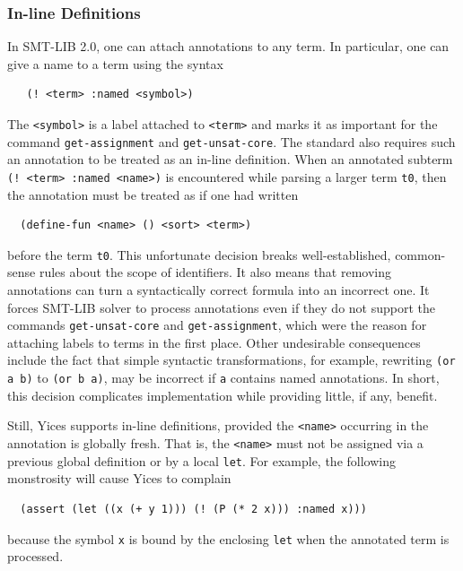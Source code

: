 \documentclass[11pt,twoside,fleqn,openright,titlepage]{cslreport}
\begin{document}
\subsubsection*{In-line Definitions}

In SMT-LIB 2.0, one can attach annotations to any term. In particular,
one can give a name to a term using the syntax
\begin{small}
\begin{verbatim}
   (! <term> :named <symbol>)
\end{verbatim}
\end{small}
The \texttt{<symbol>} is a label attached to \texttt{<term>} and marks
it as important for the command \texttt{get-assignment} and
\texttt{get-unsat-core}.  The standard also requires such an
annotation to be treated as an in-line definition. When an annotated
subterm \texttt{(! <term> :named <name>)} is encountered while parsing
a larger term \texttt{t0}, then the annotation must be treated as if
one had written
\begin{small}
\begin{verbatim}
  (define-fun <name> () <sort> <term>)
\end{verbatim}
\end{small}
before the term \texttt{t0}. This unfortunate decision breaks
well-established, common-sense rules about the scope of
identifiers. It also means that removing annotations can turn a
syntactically correct formula into an incorrect one. It forces SMT-LIB
solver to process annotations even if they do not support the commands
\texttt{get-unsat-core} and \texttt{get-assignment}, which were the
reason for attaching labels to terms in the first place.  Other
undesirable consequences include the fact that simple syntactic
transformations, for example, rewriting \texttt{(or a b)} to
\texttt{(or b a)}, may be incorrect if \texttt{a} contains named
annotations.  In short, this decision complicates implementation
while providing little, if any, benefit.

\medskip\noindent Still, Yices supports in-line definitions, provided
the \texttt{<name>} occurring in the annotation is globally fresh. That
is, the \texttt{<name>} must not be assigned via a previous global
definition or by a local \texttt{let}.  For example, the following
monstrosity will cause Yices to complain
\begin{small}
\begin{verbatim}
  (assert (let ((x (+ y 1))) (! (P (* 2 x))) :named x)))
\end{verbatim}
\end{small}
because the symbol \texttt{x} is bound by the enclosing \texttt{let}
when the annotated term is processed.
\end{document}
